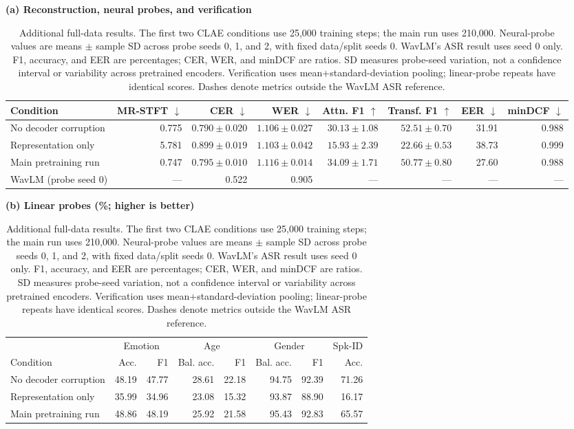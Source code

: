 \documentclass[11pt,a4paper]{article}
\begin{document}
\begin{table}[t]
\centering
\footnotesize
\setlength{\tabcolsep}{3pt}
\textbf{(a) Reconstruction, neural probes, and verification}\par\smallskip
\begin{tabular}{@{}lrrrrrrr@{}}
\toprule
Condition & MR-STFT $\downarrow$ & CER $\downarrow$ & WER $\downarrow$ & Attn. F1 $\uparrow$ & Transf. F1 $\uparrow$ & EER $\downarrow$ & minDCF $\downarrow$ \\
\midrule
No decoder corruption & 0.775 & $0.790\pm0.020$ & $1.106\pm0.027$ & $30.13\pm1.08$ & $52.51\pm0.70$ & 31.91 & 0.988 \\
Representation only & 5.781 & $0.899\pm0.019$ & $1.103\pm0.042$ & $15.93\pm2.39$ & $22.66\pm0.53$ & 38.73 & 0.999 \\
Main pretraining run & 0.747 & $0.795\pm0.010$ & $1.116\pm0.014$ & $34.09\pm1.71$ & $50.77\pm0.80$ & 27.60 & 0.988 \\
\midrule
WavLM (probe seed 0) & --- & 0.522 & 0.905 & --- & --- & --- & --- \\
\bottomrule
\end{tabular}
\par\medskip
\textbf{(b) Linear probes (\%; higher is better)}\par\smallskip
\begin{tabular}{@{}lrrrrrrr@{}}
\toprule
 & \multicolumn{2}{c}{Emotion} & \multicolumn{2}{c}{Age} & \multicolumn{2}{c}{Gender} & Spk-ID \\
\cmidrule(lr){2-3}\cmidrule(lr){4-5}\cmidrule(lr){6-7}
Condition & Acc. & F1 & Bal. acc. & F1 & Bal. acc. & F1 & Acc. \\
\midrule
No decoder corruption & 48.19 & 47.77 & 28.61 & 22.18 & 94.75 & 92.39 & 71.26 \\
Representation only & 35.99 & 34.96 & 23.08 & 15.32 & 93.87 & 88.90 & 16.17 \\
Main pretraining run & 48.86 & 48.19 & 25.92 & 21.58 & 95.43 & 92.83 & 65.57 \\
\bottomrule
\end{tabular}
\caption{Additional full-data results. The first two CLAE conditions use 25,000 training steps; the main run uses 210,000. Neural-probe values are means $\pm$ sample SD across probe seeds 0, 1, and 2, with fixed data/split seeds 0. WavLM's ASR result uses seed 0 only. F1, accuracy, and EER are percentages; CER, WER, and minDCF are ratios. SD measures probe-seed variation, not a confidence interval or variability across pretrained encoders. Verification uses mean+standard-deviation pooling; linear-probe repeats have identical scores. Dashes denote metrics outside the WavLM ASR reference.}
\label{tab:appendix-full-suite-a}
\end{table}
\end{document}
